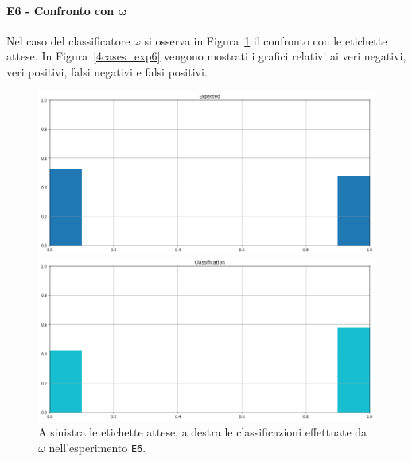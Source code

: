 \documentclass[12pt]{report}
\theoremstyle{definition}
\begin{document}
\paragraph{E6 - Confronto con $\bm{\omega}$}
Nel caso del classificatore $\omega$ si osserva in Figura~\ref{classification_exp6} il confronto con le etichette attese. 
In Figura~\ref{4cases_exp6} vengono mostrati i grafici relativi ai veri negativi, veri positivi, falsi negativi e falsi positivi.
\begin{figure}
\centering
    \begin{minipage}{0.48\textwidth}
        \includegraphics[width=\linewidth]{images/experiment_beta05_sovrapposti/expected_classification.png}
    \end{minipage}
    \begin{minipage}{0.48\textwidth}
        \includegraphics[width=\linewidth]{images/experiment_beta05_sovrapposti/prediction_classification.png}
    \end{minipage}
    \caption{A sinistra le etichette attese, a destra le classificazioni effettuate da $\omega$ nell'esperimento \texttt{E6}.}
    \label{classification_exp6}
\end{figure}
\end{document}

